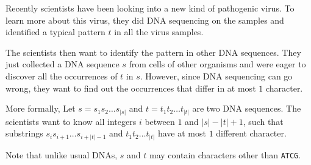 Recently scientists have been looking into a new kind of pathogenic virus.
To learn more about this virus, they did DNA sequencing on the samples and identified a typical pattern $t$ in all the virus samples.

The scientists then want to identify the pattern in other DNA sequences.
They just collected a DNA sequence $s$ from cells of other organisms and were eager to discover all the occurrences of $t$ in $s$.
However, since DNA sequencing can go wrong, they want to find out the occurrences that differ in at most $1$ character.

More formally, Let $s=s_1s_2\ldots s_{|s|}$ and $t = t_1t_2\ldots t_{|t|}$ are two DNA sequences.
The scientists want to know all integers $i$ between $1$ and $|s|-|t|+1$, such that substrings $s_is_{i+1}\ldots s_{i+|t|-1}$ and $t_1t_2\ldots t_{|t|}$ have at most $1$ different character.

Note that unlike usual DNAs, $s$ and $t$ may contain characters other than \texttt{ATCG}.